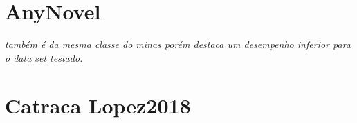 


\section{AnyNovel}

\textit{também é da mesma classe do minas porém  destaca um
desempenho inferior para o \emph{data set} testado.}


\section{Catraca Lopez2018}

\cite{Lopez2018}



